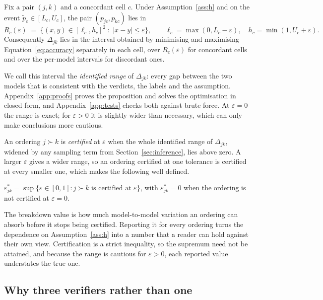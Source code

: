 \begin{proposition}
\label{prop:range}
Fix a pair $(j,k)$ and a concordant cell $c$. Under Assumption~\ref{ass:h} and on the event
$\tilde p_{c} \in [L_c, U_c]$, the pair $(p_{jc}, p_{kc})$ lies in
\[
R_c(\varepsilon) \;=\; \bigl\{ (x,y) \in [\ell_c, h_c]^2 \;:\; |x - y| \le \varepsilon \bigr\},
\qquad \ell_c = \max(0, L_c - \varepsilon), \quad h_c = \min(1, U_c + \varepsilon).
\]
Consequently $\Delta_{jk}$ lies in the interval obtained by minimising and maximising
Equation~\eqref{eq:accuracy} separately in each cell, over $R_c(\varepsilon)$ for concordant
cells and over the per-model intervals for discordant ones.
\end{proposition}

We call this interval the \emph{identified range} of $\Delta_{jk}$: every gap between the two
models that is consistent with the verdicts, the labels and the assumption. Appendix~\ref{app:proofs}
proves the proposition and solves the optimisation in closed form, and Appendix~\ref{app:tests}
checks both against brute force. At $\varepsilon = 0$ the range is exact; for $\varepsilon > 0$ it
is slightly wider than necessary, which can only make conclusions more cautious.

An ordering $j \succ k$ is \emph{certified} at $\varepsilon$ when the whole identified range of
$\Delta_{jk}$, widened by any sampling term from Section~\ref{sec:inference}, lies above zero. A
larger $\varepsilon$ gives a wider range, so an ordering certified at one tolerance is certified at
every smaller one, which makes the following well defined.

\begin{definition}
\label{def:breakdown}
$\varepsilon^*_{jk} = \sup\{\varepsilon \in [0, 1] : j \succ k \text{ is certified at }
\varepsilon\}$, with $\varepsilon^*_{jk} = 0$ when the ordering is not certified at
$\varepsilon = 0$.
\end{definition}

The breakdown value is how much model-to-model variation an ordering can absorb before it stops
being certified. Reporting it for every ordering turns the dependence on Assumption~\ref{ass:h} into
a number that a reader can hold against their own view. Certification is a strict inequality, so
the supremum need not be attained, and because the range is cautious for $\varepsilon > 0$, each
reported value understates the true one.

\subsection{Why three verifiers rather than one}

